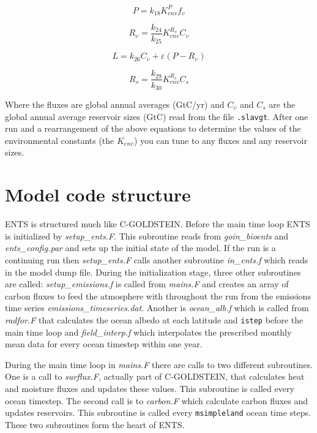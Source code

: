 \documentclass[10pt,a4paper]{report}
\begin{document}
\begin{displaymath}
P=k_{18}K_{env}^P f_{\upsilon}
\end{displaymath}

\begin{displaymath}
R_{\upsilon}=\frac{k_{24}}{k_{25}}K_{env}^{R_{\upsilon}}C_{\upsilon}
\end{displaymath}

\begin{displaymath}
L=k_{26}C_{\upsilon}+\varepsilon(P-R_\upsilon)
\end{displaymath}

\begin{equation}
R_s=\frac{k_{29}}{k_{30}}K_{env}^{R_s}C_s
\end{equation}

Where the fluxes are global annual averages (GtC/yr) and
$C_{\upsilon}$ and $C_s$ are the global annual average reservoir
sizes (GtC) read from the file {\tt .slavgt}. After one run and a
rearrangement of the above equations to determine the values of the
environmental constants (the $K_{env}$) you can tune to any fluxes
and any reservoir sizes.

\chapter{Model code structure}

ENTS is structured much like C-GOLDSTEIN. Before the main time loop
ENTS is initialized by {\em setup\_ents.F}. This subroutine reads
from {\em goin\_bioents} and {\em ents\_config.par} and sets up the
initial state of the model. If the run is a continuing run then {\em
setup\_ents.F} calls another subroutine {\em in\_ents.f} which reads
in the model dump file. During the initialization stage, three other
subroutines are called: {\em setup\_emissions.f} is called from {\em
mains.F} and creates an array of carbon fluxes to feed the
atmosphere with throughout the run from the emissions time series
{\em emissions\_timeseries.dat}. Another is {\em ocean\_alb.f} which
is called from {\em radfor.F} that calculates the ocean albedo at
each latitude and {\tt istep} before the main time loop and {\em
field\_interp.f} which interpolates the prescribed monthly mean data
for every ocean timestep within one year.

During the main time loop in {\em mains.F} there are calls to two
different subroutines. One is a call to {\em surflux.F}, actually
part of C-GOLDSTEIN, that calculates heat and moisture fluxes and
updates these values. This subroutine is called every ocean
timestep. The second call is to {\em carbon.F} which calculate
carbon fluxes and updates reservoirs. This subroutine is called
every {\tt msimpleland} ocean time steps. These two subroutines form
the heart of ENTS.
\end{document}
